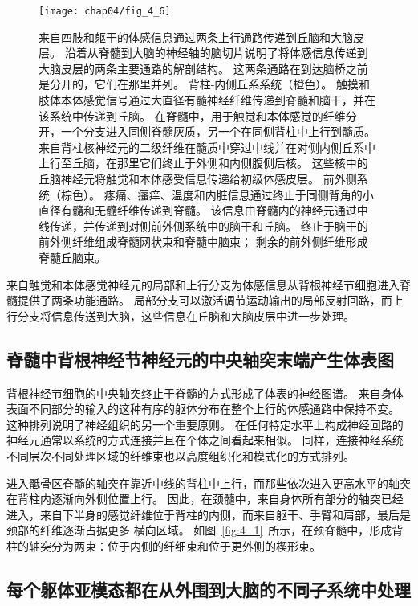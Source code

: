 \begin{figure}[htbp]
	\centering
	\texttt{[image: chap04/fig\_4\_6]}
	\caption{来自四肢和躯干的体感信息通过两条上行通路传递到丘脑和大脑皮层。
		沿着从脊髓到大脑的神经轴的脑切片说明了将体感信息传递到大脑皮层的两条主要通路的解剖结构。
		这两条通路在到达脑桥之前是分开的，它们在那里并列。 背柱-内侧丘系系统（橙色）。
		触摸和肢体本体感觉信号通过大直径有髓神经纤维传递到脊髓和脑干，并在该系统中传递到丘脑。
		在脊髓中，用于触觉和本体感觉的纤维分开，一个分支进入同侧脊髓灰质，另一个在同侧背柱中上行到髓质。 
		来自背柱核神经元的二级纤维在髓质中穿过中线并在对侧内侧丘系中上行至丘脑，在那里它们终止于外侧和内侧腹侧后核。
		这些核中的丘脑神经元将触觉和本体感受信息传递给初级体感皮层。
		前外侧系统（棕色）。
		疼痛、瘙痒、温度和内脏信息通过终止于同侧背角的小直径有髓和无髓纤维传递到脊髓。
		该信息由脊髓内的神经元通过中线传递，并传递到对侧前外侧系统中的脑干和丘脑。
		终止于脑干的前外侧纤维组成脊髓网状束和脊髓中脑束； 剩余的前外侧纤维形成脊髓丘脑束。}
	\label{fig:4_6}
\end{figure}


来自触觉和本体感觉神经元的局部和上行分支为体感信息从背根神经节细胞进入脊髓提供了两条功能通路。 
局部分支可以激活调节运动输出的局部反射回路，而上行分支将信息传送到大脑，这些信息在丘脑和大脑皮层中进一步处理。



\subsection{脊髓中背根神经节神经元的中央轴突末端产生体表图}

背根神经节细胞的中央轴突终止于脊髓的方式形成了体表的神经图谱。
来自身体表面不同部分的输入的这种有序的躯体分布在整个上行的体感通路中保持不变。
这种排列说明了神经组织的另一个重要原则。
在任何特定水平上构成神经回路的神经元通常以系统的方式连接并且在个体之间看起来相似。 
同样，连接神经系统不同层次不同处理区域的纤维束也以高度组织化和模式化的方式排列。


进入骶骨区脊髓的轴突在靠近中线的背柱中上行，而那些依次进入更高水平的轴突在背柱内逐渐向外侧位置上行。 
因此，在颈髓中，来自身体所有部分的轴突已经进入，来自下半身的感觉纤维位于背柱的内侧，而来自躯干、手臂和肩部，最后是颈部的纤维逐渐占据更多 横向区域。 
如图~\ref{fig:4_1}~所示，在颈脊髓中，形成背柱的轴突分为两束：位于内侧的纤细束和位于更外侧的楔形束。



\subsection{每个躯体亚模态都在从外围到大脑的不同子系统中处理}

